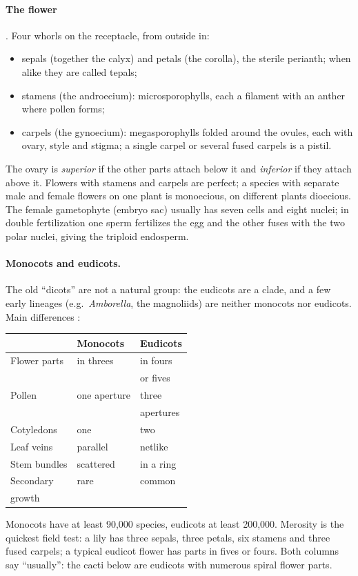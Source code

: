\paragraph{The flower}
\cite[Chapter 19]{evert2013raven}. Four
whorls on the receptacle, from outside in:
\begin{itemize}
\item sepals (together the calyx) and
petals (the corolla), the sterile perianth;
when alike they are called tepals;
\item stamens (the androecium):
microsporophylls, each a filament with an
anther where pollen forms;
\item carpels (the gynoecium):
megasporophylls folded around the ovules,
each with ovary, style and stigma; a single
carpel or several fused carpels is a
pistil.
\end{itemize}
The ovary is \emph{superior} if the other
parts attach below it and \emph{inferior}
if they attach above it. Flowers with
stamens and carpels are perfect; a species
with separate male and female flowers on
one plant is monoecious, on different
plants dioecious. The female gametophyte
(embryo sac) usually has seven cells and
eight nuclei; in double fertilization one
sperm fertilizes the egg and the other
fuses with the two polar nuclei, giving the
triploid endosperm.

\paragraph{Monocots and eudicots.}
The old ``dicots'' are not a natural
group: the eudicots are a clade, and a few
early lineages (e.g.\ \emph{Amborella}, the
magnoliids) are neither monocots nor
eudicots. Main differences
\cite[Table 19-1]{evert2013raven}:
\begin{center}
\begin{tabular}{lll}
& Monocots & Eudicots \\
\hline
Flower parts & in threes & in fours \\
& & or fives \\
Pollen & one aperture & three \\
& & apertures \\
Cotyledons & one & two \\
Leaf veins & parallel & netlike \\
Stem bundles & scattered & in a ring \\
Secondary & rare & common \\
growth & & \\
\end{tabular}
\end{center}
Monocots have at least 90,000 species,
eudicots at least 200,000. Merosity is the
quickest field test: a lily has three
sepals, three petals, six stamens and three
fused carpels; a typical eudicot flower has
parts in fives or fours. Both columns say
``usually'': the cacti below are eudicots
with numerous spiral flower parts.

